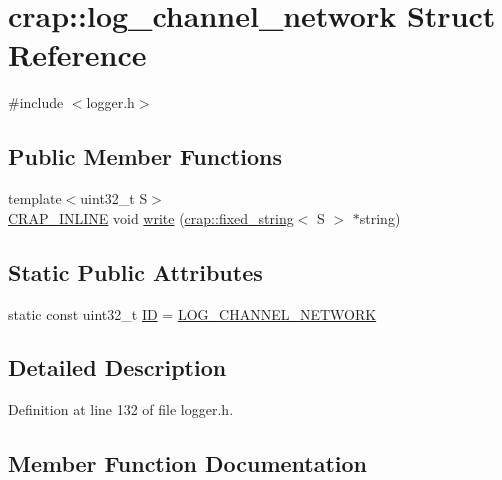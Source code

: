 \hypertarget{structcrap_1_1log__channel__network}{}\section{crap\+:\+:log\+\_\+channel\+\_\+network Struct Reference}
\label{structcrap_1_1log__channel__network}


{\ttfamily \#include $<$logger.\+h$>$}

\subsection*{Public Member Functions}
\begin{DoxyCompactItemize}
\item 
{\footnotesize template$<$uint32\+\_\+t S$>$ }\\\hyperlink{config__x86_8h_a5a40526b8d842e7ff731509998bb0f1c}{C\+R\+A\+P\+\_\+\+I\+N\+L\+I\+N\+E} void \hyperlink{structcrap_1_1log__channel__network_a94cf47c130d05ea96c52b08d898ca2f7}{write} (\hyperlink{classcrap_1_1fixed__string}{crap\+::fixed\+\_\+string}$<$ S $>$ $\ast$string)
\end{DoxyCompactItemize}
\subsection*{Static Public Attributes}
\begin{DoxyCompactItemize}
\item 
static const uint32\+\_\+t \hyperlink{structcrap_1_1log__channel__network_a9d37e300da8a29f863ebd5c6d122b15d}{I\+D} = \hyperlink{logger_8h_a2202dc835c428ec70a73ee0892e99017}{L\+O\+G\+\_\+\+C\+H\+A\+N\+N\+E\+L\+\_\+\+N\+E\+T\+W\+O\+R\+K}
\end{DoxyCompactItemize}


\subsection{Detailed Description}


Definition at line 132 of file logger.\+h.



\subsection{Member Function Documentation}
\hypertarget{structcrap_1_1log__channel__network_a94cf47c130d05ea96c52b08d898ca2f7}{}

